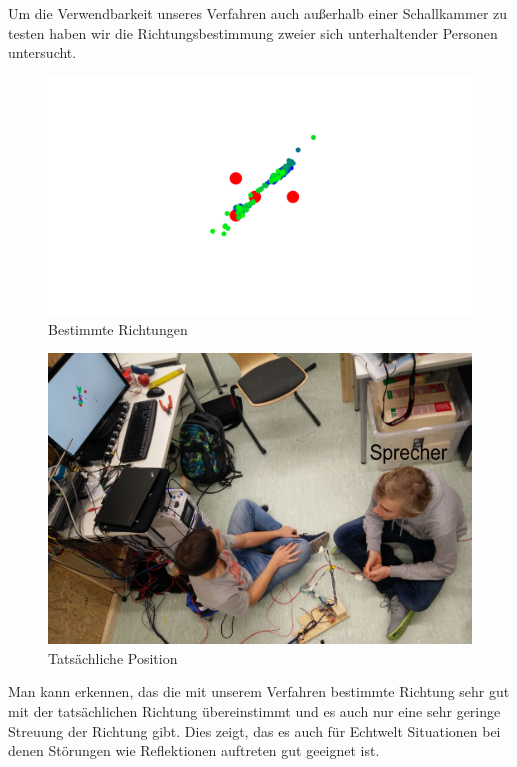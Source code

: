 Um die Verwendbarkeit unseres Verfahren auch außerhalb einer Schallkammer zu testen haben wir die Richtungsbestimmung zweier sich unterhaltender Personen untersucht.
\begin{minipage}{0.49\linewidth}
  \begin{figure}[H]
    \centering
    \includegraphics[width=\textwidth]{img/real_real_data}
    \caption{Bestimmte Richtungen}
    \label{fig:real_real_data}
  \end{figure}
\end{minipage}
\begin{minipage}{0.49\linewidth}
  \begin{figure}[H]
    \centering
    \includegraphics[width=\textwidth]{img/real_real}
    \caption{Tatsächliche Position}
    \label{fig:real_real}
  \end{figure}
\end{minipage}

Man kann erkennen, das die mit unserem Verfahren bestimmte Richtung sehr gut mit der tatsächlichen Richtung übereinstimmt und es auch nur eine sehr geringe Streuung der Richtung gibt. Dies zeigt, das es auch für Echtwelt Situationen bei denen Störungen wie Reflektionen auftreten gut geeignet ist.